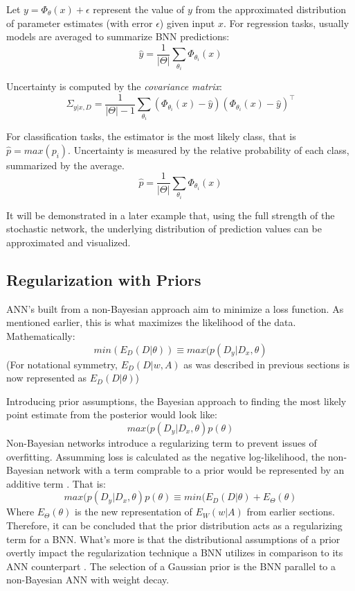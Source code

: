 Let $y = \Phi_{\theta} (x) + \epsilon$ represent the value of $y$ from the approximated distribution of parameter estimates (with error $\epsilon$) given input $x$.
For regression tasks, usually models are averaged to summarize BNN predictions: 
$$
\hat{y} = \frac{1}{|\Theta|} \sum_{\theta_i} \Phi_{\theta_i}(x)
$$

Uncertainty is computed by the \textit{covariance matrix}:
$$
\Sigma_{y|x,D} = \frac{1}{|\Theta|-1} \sum_{\theta_i} (\Phi_{\theta_i}(x) - \hat{y}) (\Phi_{\theta_i}(x) - \hat{y})^\intercal
$$

For classification tasks, the estimator is the most likely class, that is $\hat{p} = max(p_i)$.  Uncertainty is measured by the relative probability of each class, summarized by the average.
$$
\hat{p} = \frac{1}{|\Theta|} \sum_{\theta_i} \Phi_{\theta_i}(x)
$$

It will be demonstrated in a later example that, using the full strength of the stochastic network, the underlying distribution of prediction values can be approximated and visualized. \cite{ziyin2022stochastic}


\subsection{Regularization with Priors}


ANN's built from a non-Bayesian approach aim to minimize a loss function.  As mentioned earlier, this is what maximizes the likelihood of the data.  Mathematically:
$$
min(E_D(D|\theta)) \equiv max(p(D_y|D_x,\theta)
$$
(For notational symmetry, $E_D(D|w,A)$ as was described in previous sections is now represented as $E_D(D|\theta)$)

Introducing prior assumptions, the Bayesian approach to finding the most likely point estimate from the posterior would look like:
$$
 max(p(D_y|D_x,\theta)p(\theta)
$$
Non-Bayesian networks introduce a regularizing term to prevent issues of overfitting.  Assumming loss is calculated as the negative log-likelihood, the non-Bayesian network with a term comprable to a prior would be represented by an additive term \cite{Jospin}.  That is:
$$
 max(p(D_y|D_x,\theta)p(\theta) \equiv min(E_D(D|\theta) + E_{\Theta}(\theta)
$$
Where $E_{\Theta}(\theta)$ is the new representation of $E_W(w|A)$ from earlier sections.  Therefore, it can be concluded that the prior distribution acts as a regularizing term for a BNN.  What's more is that the distributional assumptions of a prior overtly impact the regularization technique a BNN utilizes in comparison to its ANN counterpart \cite{vladimirova2019understanding}.  The selection of a Gaussian prior %
is the BNN parallel to a non-Bayesian ANN with weight decay.


